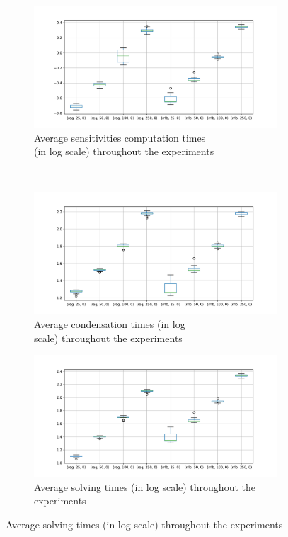 \documentclass[12pt]{article}
\begin{document}
\begin{itemize}[label=\textbullet]
	\begin{figure}[!h]
		\centering
		\begin{subfigure}{.5\linewidth}
			\centering
			\includegraphics[width=1.0\textwidth]{images/exp_all_plot_runtimes_1.png}
			\caption{Average sensitivities computation times \\(in log scale) throughout the experiments}
			\label{fig:sensitivity-times}
		\end{subfigure}\,%
		\begin{subfigure}{.5\linewidth}
			\centering
			\includegraphics[width=1.0\textwidth]{images/exp_all_plot_runtimes_2.png}
			\caption{Average condensation times (in log \\ scale) throughout the experiments}
			\label{fig:condensation-times}
		\end{subfigure}\newline
		\begin{subfigure}{.5\linewidth}
			\centering
			\includegraphics[width=1.0\textwidth]{images/exp_all_plot_runtimes_3.png}
			\caption{Average solving times (in log scale) throughout the experiments}
			\label{fig:solving-times}
		\end{subfigure}


\end{figure}
\end{itemize}
\end{document}
